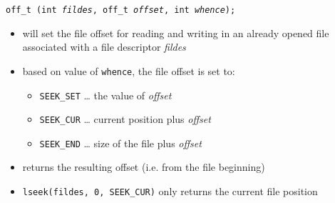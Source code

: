 \begin{slide}
\texttt{off\_t (int \emph{fildes}, off\_t \emph{offset},
int \emph{whence});}
\begin{itemize}
\item will set the file offset for reading and writing in an already
opened file associated with a file descriptor \emph{fildes}
\item based on value of \texttt{whence}, the file offset is set to:
    \begin{itemize}
    \item \texttt{SEEK\_SET} \dots{} the value of \emph{offset}
    \item \texttt{SEEK\_CUR} \dots{} current position plus \emph{offset}
    \item \texttt{SEEK\_END} \dots{} size of the file plus \emph{offset}
    \end{itemize}
\item returns the resulting offset (i.e. from the file beginning)
\item \texttt{lseek(fildes, 0, SEEK\_CUR)} only returns the current file
position
\end{itemize}
\end{slide}

